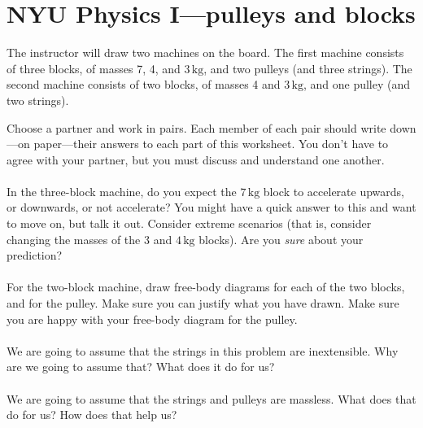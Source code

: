 \documentclass[12pt]{article}
\newcommand{\kg}{\mathrm{kg}}
\newcounter{problem}
\begin{document}
\sloppy\sloppypar\raggedbottom\frenchspacing\thispagestyle{empty}

\section*{NYU Physics I---pulleys and blocks}

The instructor will draw two machines on the board. The first machine
consists of three blocks, of masses 7, 4, and $3\,\kg$, and two
pulleys (and three strings). The second machine consists of two
blocks, of masses 4 and $3\,\kg$, and one pulley (and two strings).

Choose a partner and work in pairs. Each member of each pair should
write down---on paper---their answers to each part of this worksheet.
You don't have to agree with your partner, but you must discuss and
understand one another.

\paragraph{\theproblem}%
In the three-block machine, do you expect the $7\,\kg$ block to
accelerate upwards, or downwards, or not accelerate? You might have a
quick answer to this and want to move on, but talk it out. Consider
extreme scenarios (that is, consider changing the masses of the 3 and
$4\,\kg$ blocks). Are you \emph{sure} about your prediction?

\paragraph{\theproblem}%
For the two-block machine, draw free-body diagrams for each of the two
blocks, and for the pulley. Make sure you can justify what you have
drawn. Make sure you are happy with your free-body diagram for the
pulley.

\paragraph{\theproblem}%
We are going to assume that the strings in this problem are
inextensible. Why are we going to assume that? What does it do for us?

\paragraph{\theproblem}%
We are going to assume that the strings and pulleys are massless. What
does that do for us? How does that help us?
\end{document}
